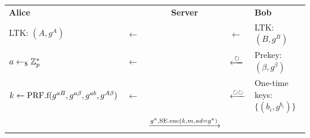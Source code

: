 \begin{tabular}{lC{2cm}cC{2cm}l}
\textbf{Alice} & & \textbf{Server} & & \textbf{Bob}\\
LTK: $(A, g^A)$ & $\longleftarrow$ & & $\longleftarrow$ & LTK: $(B, g^B)$\\
$a\gets_\$\mathbb{Z}_p^*$ & $\longleftarrow$ & & $\xlongleftarrow{\circlearrowright}$ & Prekey: $(\beta, g^\beta)$\\
$k\gets\mathrm{PRF}.\mathrm{f}(g^{aB}, g^{a\beta}, g^{ab}, g^{A\beta})$ & $\longleftarrow$ & & $\xlongleftarrow{\circlearrowright\circlearrowright}$ & One-time keys: $\{(b_i, g^{b_i})\}$\\
& & $\xlongrightarrow{g^a, \SYEenc(k, m, \ad=g^a)}$ & &
\end{tabular}